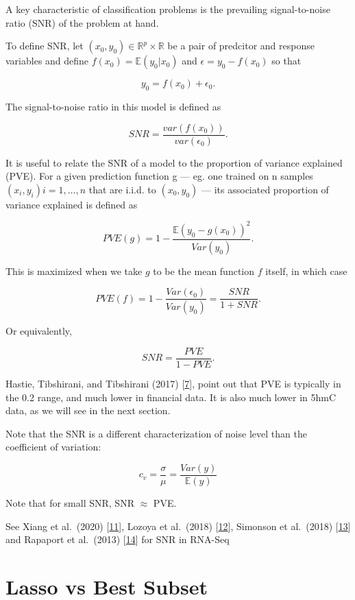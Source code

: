 \documentclass[
]{book}
\begin{document}
A key characteristic of classification problems is the
prevailing signal-to-noise ratio (SNR) of the problem at hand.

To define SNR, let \((x_0, y_0) \in \mathbb{R}^p \times \mathbb{R}\)
be a pair of predcitor and response variables and define
\(f(x_0) = \mathbb{E}(y_0|x_0)\) and \(\epsilon = y_0 - f(x_0)\) so that

\[y_0 = f(x_0) + \epsilon_0.\]

The signal-to-noise ratio in this model is defined as

\[SNR=\frac{var(f(x_0))}{var(\epsilon_0)}.\]

It is useful to relate the SNR of a model to the proportion of variance explained (PVE).
For a given prediction function g --- eg. one trained on n samples
\((x_i, y_i) i = 1, \dots, n\) that are i.i.d. to \((x_0, y_0)\) --- its
associated proportion of variance explained is defined as

\[PVE(g)=1 - \frac{\mathbb{E}(y_0-g(x_0))^2}{Var(y_0)}.\]

This is maximized when we take \(g\) to be the mean function \(f\) itself,
in which case

\[PVE(f) = 1 - \frac{Var(\epsilon_0)}{Var(y_0)} = \frac{SNR}{1+SNR}.\]

Or equivalently,

\[SNR = \frac{PVE}{1-PVE}.\]

Hastie, Tibshirani, and Tibshirani (2017) {[}\protect\hyperlink{ref-Hastie:2017aa}{7}{]}, point out that
PVE is typically in the 0.2 range, and much lower in financial data. It
is also much lower in 5hmC data, as we will see in the next section.

Note that the SNR is a different characterization of noise level than the
coefficient of variation:

\[c_v = \frac{\sigma}{\mu}=\frac{Var(y)}{\mathbb{E}(y)}\]

Note that for small SNR, SNR \(\approx\) PVE.

See Xiang et al.~(2020) {[}\protect\hyperlink{ref-Xiang:2020aa}{11}{]}, Lozoya et al.~(2018) {[}\protect\hyperlink{ref-Lozoya:2018aa}{12}{]},
Simonson et al.~(2018) {[}\protect\hyperlink{ref-Simonsen:2018aa}{13}{]} and
Rapaport et al.~(2013) {[}\protect\hyperlink{ref-Rapaport:2013aa}{14}{]} for SNR in RNA-Seq

\hypertarget{lasso-vs-best-sub}{%
\section{Lasso vs Best Subset}\label{lasso-vs-best-sub}}
\end{document}
